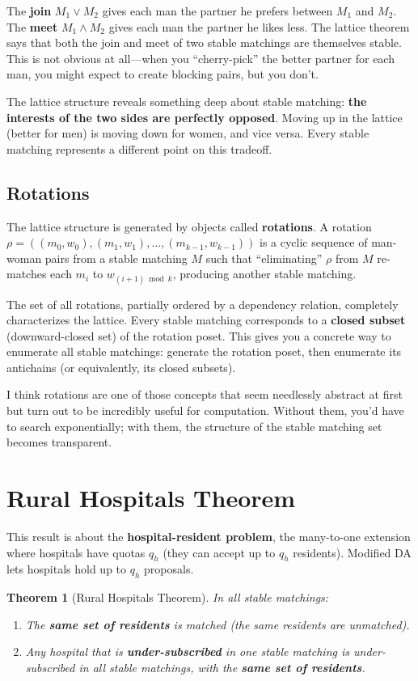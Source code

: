 \documentclass[11pt]{article}
\newtheorem{theorem}{Theorem}
\begin{document}
The \textbf{join} $M_1 \vee M_2$ gives each man the partner he prefers between $M_1$ and $M_2$. The \textbf{meet} $M_1 \wedge M_2$ gives each man the partner he likes less. The lattice theorem says that both the join and meet of two stable matchings are themselves stable. This is not obvious at all---when you ``cherry-pick'' the better partner for each man, you might expect to create blocking pairs, but you don't.

The lattice structure reveals something deep about stable matching: \textbf{the interests of the two sides are perfectly opposed}. Moving up in the lattice (better for men) is moving down for women, and vice versa. Every stable matching represents a different point on this tradeoff.

\subsection{Rotations}

The lattice structure is generated by objects called \textbf{rotations}. A rotation $\rho = ((m_0, w_0), (m_1, w_1), \ldots, (m_{k-1}, w_{k-1}))$ is a cyclic sequence of man-woman pairs from a stable matching $M$ such that ``eliminating'' $\rho$ from $M$ re-matches each $m_i$ to $w_{(i+1) \bmod k}$, producing another stable matching.

The set of all rotations, partially ordered by a dependency relation, completely characterizes the lattice. Every stable matching corresponds to a \textbf{closed subset} (downward-closed set) of the rotation poset. This gives you a concrete way to enumerate all stable matchings: generate the rotation poset, then enumerate its antichains (or equivalently, its closed subsets).

I think rotations are one of those concepts that seem needlessly abstract at first but turn out to be incredibly useful for computation. Without them, you'd have to search exponentially; with them, the structure of the stable matching set becomes transparent.

\section{Rural Hospitals Theorem}

This result is about the \textbf{hospital-resident problem}, the many-to-one extension where hospitals have quotas $q_h$ (they can accept up to $q_h$ residents). Modified DA lets hospitals hold up to $q_h$ proposals.

\begin{theorem}[Rural Hospitals Theorem]
In all stable matchings:
\begin{enumerate}
\item The \textbf{same set of residents} is matched (the same residents are unmatched).
\item Any hospital that is \textbf{under-subscribed} in one stable matching is under-subscribed in all stable matchings, with the \textbf{same set of residents}.
\end{enumerate}
\end{theorem}
\end{document}
